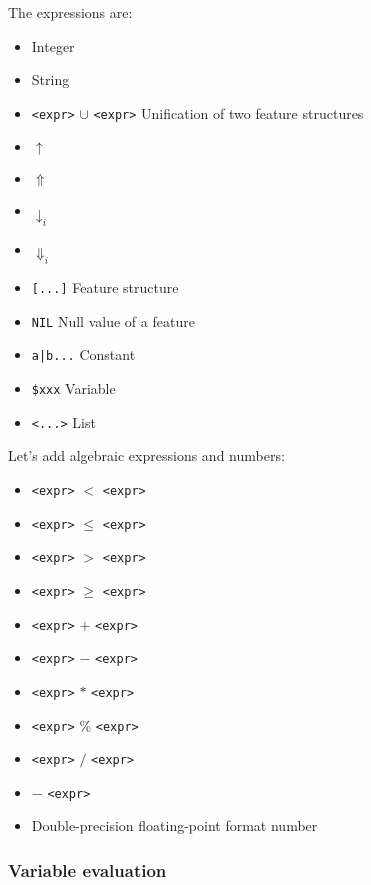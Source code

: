\documentclass[11pt]{article}
\begin{document}
\begin{itemize}
    The expressions are:
    
    \begin{itemize}
    \item Integer
    \item String
    \item \verb#<expr>#  $\cup$ \verb#<expr># Unification of two
      feature structures
    \item $\uparrow$
    \item $\Uparrow$
    \item $\downarrow_i$
    \item $\Downarrow_i$
    \item \verb#[...]# Feature structure
    \item \verb#NIL# Null value of a feature
    \item \verb#a|b...# Constant
    \item \verb#$xxx# Variable
    \item \verb#<...># List
    \end{itemize}
    
Let's add algebraic expressions and numbers:
    
    \begin{itemize}
    \item \verb#<expr>#  $<$ \verb#<expr>#
    \item \verb#<expr>#  $\le$ \verb#<expr>#
    \item \verb#<expr>#  $>$ \verb#<expr>#
    \item \verb#<expr>#  $\ge$ \verb#<expr>#
    \item \verb#<expr>#  $+$ \verb#<expr>#
    \item \verb#<expr>#  $-$ \verb#<expr>#
    \item \verb#<expr>#  $*$ \verb#<expr>#
    \item \verb#<expr>#  \% \verb#<expr>#
    \item \verb#<expr>#  $/$ \verb#<expr>#
    \item $-$ \verb#<expr>#
    \item Double-precision floating-point format number
    \end{itemize}
    
  \end{itemize}
  
\subsubsection*{Variable evaluation}
\end{document}

